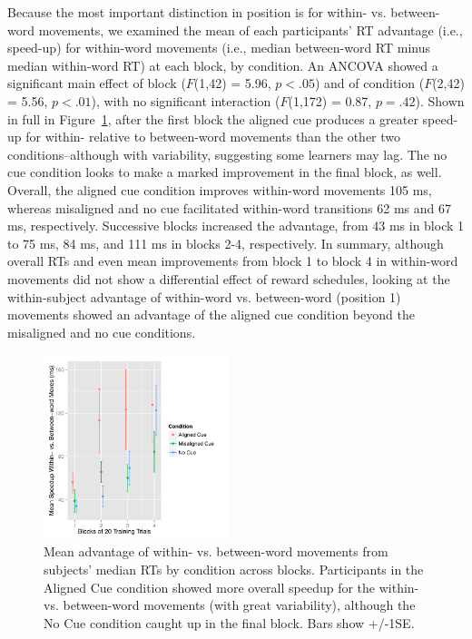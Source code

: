 \documentclass[conference]{IEEEtran}
\begin{document}
Because the most important distinction in position is for within- vs. between-word movements, we examined the mean of each participants' RT advantage (i.e., speed-up) for within-word movements (i.e., median between-word RT minus median within-word RT) at each block, by condition. An ANCOVA showed a significant main effect of block ($F$(1,42) = 5.96, $p<.05$) and of condition ($F$(2,42) = 5.56, $p<.01$), with no significant interaction ($F$(1,172) = 0.87, $p=.42$). Shown in full in Figure~\ref{fig:exp2within_between_advantage}, after the first block the aligned cue produces a greater speed-up for within- relative to between-word movements than the other two conditions--although with variability, suggesting some learners may lag. The no cue condition looks to make a marked improvement in the final block, as well. Overall, the aligned cue condition improves within-word movements 105 ms, whereas misaligned and no cue facilitated within-word transitions 62 ms and 67 ms, respectively. Successive blocks increased the advantage, from 43 ms in block 1 to 75 ms, 84 ms, and 111 ms in blocks 2-4, respectively. In summary, although overall RTs and even mean improvements from block 1 to block 4 in within-word movements did not show a differential effect of reward schedules, looking at the within-subject advantage of within-word vs. between-word (position 1) movements showed an advantage of the aligned cue condition beyond the misaligned and no cue conditions. 

\begin{figure}[h]
  \centering
  \includegraphics[width=0.48\textwidth]{figures/exp2_between_minus_withinWord_by_block}
  \caption{Mean advantage of within- vs. between-word movements from subjects' median RTs by condition across blocks. Participants in the Aligned Cue condition showed more overall speedup for the within- vs. between-word movements (with great variability), although the No Cue condition caught up in the final block. Bars show +/-1SE.}
  \label{fig:exp2within_between_advantage}
\end{figure} 
\end{document}
